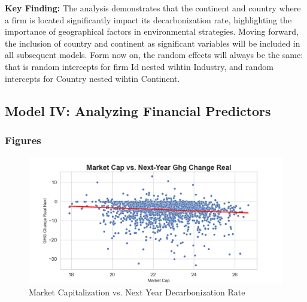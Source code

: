 \textbf{Key Finding:} The analysis demonstrates that the continent and country where a firm is located significantly impact its decarbonization rate, highlighting the importance of geographical factors in environmental strategies. Moving forward, the inclusion of country and continent as significant variables will be included in all subsequent models. Form now on, the random effects will always be the same: that is random intercepts for firm Id nested wihtin Industry, and random intercepts for Country nested wihtin Continent. 


 

\subsection{Model IV: Analyzing Financial Predictors}






\subsubsection{Figures}
\begin{figure}[H]
\centering
  \includegraphics[width=\textwidth]{figures/market_cap_vs_ghg_change_real_next.png}
\caption{Market Capitalization vs. Next Year Decarbonization Rate}
\label{fig:market_cap_vs_ghg_change_real_next}
\end{figure}

